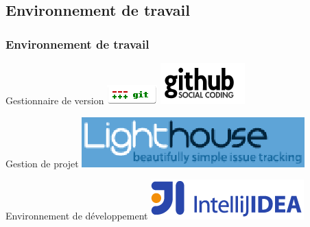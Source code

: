 \subsection{Environnement de travail}
\begin{frame}\frametitle{Environnement de travail}
\begin{minipage}[c]{.46\linewidth}
	\begin{beamerboxesrounded}[shadow=true,center]{Gestionnaire de version}
		\centering
		\includegraphics[width=.4\linewidth]{../image/gitLogo.png}
		\includegraphics[width=.3\linewidth]{../image/githubLogo.png}
	\end{beamerboxesrounded}
\end{minipage}
\hfill
\begin{minipage}[c]{.46\linewidth}
\begin{beamerboxesrounded}[shadow=true]{Gestion de projet}
	\centering
	\includegraphics[width=.7\linewidth]{../image/lighthouseLogo.png}
\end{beamerboxesrounded}
\end{minipage}
\vfill
\hfil
\begin{minipage}[c]{.6\linewidth}
\begin{beamerboxesrounded}[shadow=true]{Environnement de développement}
	\centering
	\includegraphics[width=.4\linewidth]{../image/intellijLogo.png}
\end{beamerboxesrounded}
\end{minipage}
\end{frame}

